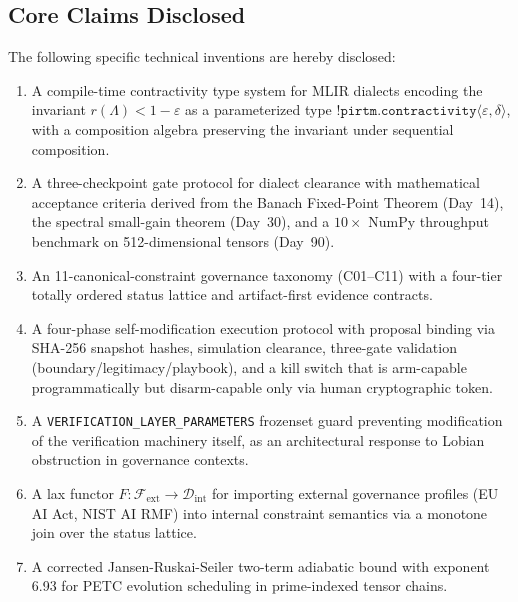 \documentclass[11pt,letterpaper]{article}
\theoremstyle{remark}
\begin{document}
\subsection{Core Claims Disclosed}

The following specific technical inventions are hereby disclosed:

\begin{enumerate}[leftmargin=2em]
  \item A compile-time contractivity type system for MLIR dialects encoding
    the invariant $r(\Lambda) < 1 - \varepsilon$ as a parameterized type
    $\texttt{!pirtm.contractivity}\langle\varepsilon,\delta\rangle$, with
    a composition algebra preserving the invariant under sequential composition.

  \item A three-checkpoint gate protocol for dialect clearance with
    mathematical acceptance criteria derived from the Banach Fixed-Point
    Theorem (Day~14), the spectral small-gain theorem (Day~30), and a
    $10\times$ NumPy throughput benchmark on 512-dimensional tensors (Day~90).

  \item An 11-canonical-constraint governance taxonomy (C01--C11) with
    a four-tier totally ordered status lattice and artifact-first evidence
    contracts.

  \item A four-phase self-modification execution protocol with proposal
    binding via SHA-256 snapshot hashes, simulation clearance,
    three-gate validation (boundary/legitimacy/playbook), and a kill switch
    that is arm-capable programmatically but disarm-capable only via human
    cryptographic token.

  \item A \texttt{VERIFICATION\_LAYER\_PARAMETERS} frozenset guard preventing
    modification of the verification machinery itself, as an architectural
    response to Lobian obstruction in governance contexts.

  \item A lax functor $F : \mathcal{F}_{\text{ext}} \to \mathcal{D}_{\text{int}}$
    for importing external governance profiles (EU AI Act, NIST AI RMF)
    into internal constraint semantics via a monotone join over the status
    lattice.

  \item A corrected Jansen-Ruskai-Seiler two-term adiabatic bound with
    exponent 6.93 for PETC evolution scheduling in prime-indexed tensor
    chains.
\end{enumerate}
\end{document}
